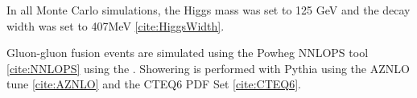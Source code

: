 In all Monte Carlo simulations, the Higgs mass was set to 125 GeV and the decay width was set to 407MeV \ref{cite:HiggsWidth}.

\begin{table}[h!]
  \centering
  \caption{Summary of nominal signal samples}
  \label{tab:signal_samples_pyt}
\end{table}

Gluon-gluon fusion events are simulated using the Powheg NNLOPS tool \ref{cite:NNLOPS} using the . Showering is performed with Pythia using the AZNLO tune \ref{cite:AZNLO} and the CTEQ6 PDF Set \ref{cite:CTEQ6}.



